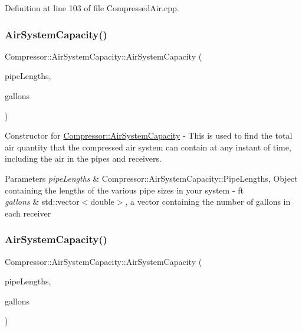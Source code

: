 Definition at line 103 of file Compressed\+Air.\+cpp.

\mbox{\label{class_compressor_1_1_air_system_capacity_a270fa85146172b46703970a1bc8fe724}} 
\subsubsection{\texorpdfstring{Air\+System\+Capacity()}{AirSystemCapacity()}\hspace{0.1cm}{\footnotesize\ttfamily [2/3]}}
{\footnotesize\ttfamily Compressor\+::\+Air\+System\+Capacity\+::\+Air\+System\+Capacity (\begin{DoxyParamCaption}\item[{\hyperlink{struct_compressor_1_1_pipe_data}{Pipe\+Data}}]{pipe\+Lengths,  }\item[{std\+::vector$<$ double $>$}]{gallons }\end{DoxyParamCaption})}

Constructor for \hyperlink{class_compressor_1_1_air_system_capacity}{Compressor\+::\+Air\+System\+Capacity} -\/ This is used to find the total air quantity that the compressed air system can contain at any instant of time, including the air in the pipes and receivers. 
\begin{DoxyParams}{Parameters}
{\em pipe\+Lengths} & Compressor\+::\+Air\+System\+Capacity\+::\+Pipe\+Lengths, Object containing the lengths of the various pipe sizes in your system -\/ ft \\
\hline
{\em gallons} & std\+::vector$<$double$>$, a vector containing the number of gallons in each receiver \\
\hline
\end{DoxyParams}
\mbox{\label{class_compressor_1_1_air_system_capacity_a270fa85146172b46703970a1bc8fe724}} 
\subsubsection{\texorpdfstring{Air\+System\+Capacity()}{AirSystemCapacity()}\hspace{0.1cm}{\footnotesize\ttfamily [3/3]}}
{\footnotesize\ttfamily Compressor\+::\+Air\+System\+Capacity\+::\+Air\+System\+Capacity (\begin{DoxyParamCaption}\item[{\hyperlink{struct_compressor_1_1_pipe_data}{Pipe\+Data}}]{pipe\+Lengths,  }\item[{std\+::vector$<$ double $>$}]{gallons }\end{DoxyParamCaption})}

